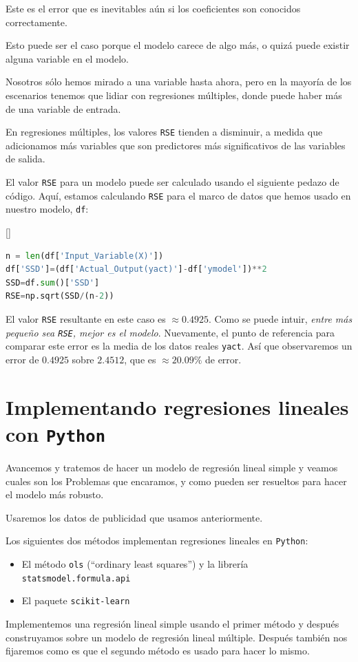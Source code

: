 Este es el error que es inevitables aún si los coeficientes son conocidos correctamente.



Esto puede ser el caso porque el modelo carece de algo más, o quizá puede existir alguna variable en el modelo.



Nosotros sólo hemos mirado a una variable hasta ahora, pero en la mayoría de los escenarios tenemos que lidiar con regresiones múltiples, donde puede haber más de una variable de entrada.



En regresiones múltiples, los valores \texttt{RSE} tienden a disminuir, a medida que adicionamos más variables que son predictores más significativos de las variables de salida.




El valor \texttt{RSE} para un modelo puede ser calculado usando el siguiente pedazo de código. Aquí, estamos calculando \texttt{RSE} para el marco de datos que hemos usado en nuestro modelo, \texttt{df}:


[]{}
\begin{lstlisting}[language=Python]
n = len(df['Input_Variable(X)'])
df['SSD']=(df['Actual_Output(yact)']-df['ymodel'])**2
SSD=df.sum()['SSD']
RSE=np.sqrt(SSD/(n-2))
\end{lstlisting}



El valor \texttt{RSE} resultante en este caso es $\approx 0.4925$. Como se puede intuir, \emph{entre más pequeño sea \texttt{RSE}, mejor es el modelo}. Nuevamente, el punto de referencia para comparar este error es la media de los datos reales \texttt{yact}. Así que observaremos un error de $0.4925$ sobre $2.4512$, que es $\approx 20.09\%$ de error.


\section{Implementando regresiones lineales con \texttt{Python}}

Avancemos y tratemos de hacer un modelo de regresión lineal simple y veamos cuales son los Problemas que encaramos, y como pueden ser resueltos para hacer el modelo más robusto.



Usaremos los datos de publicidad que usamos anteriormente.


Los siguientes dos métodos implementan regresiones lineales en \texttt{Python}:
\begin{itemize}
 \item El método \texttt{ols} (``ordinary least squares'') y la librería \texttt{statsmodel.formula.api}
 \item El paquete \texttt{scikit-learn}
\end{itemize}
 Implementemos una regresión lineal simple usando el primer método y después construyamos sobre un modelo de regresión lineal múltiple. Después también nos fijaremos como es que el segundo método es usado para hacer lo mismo.

